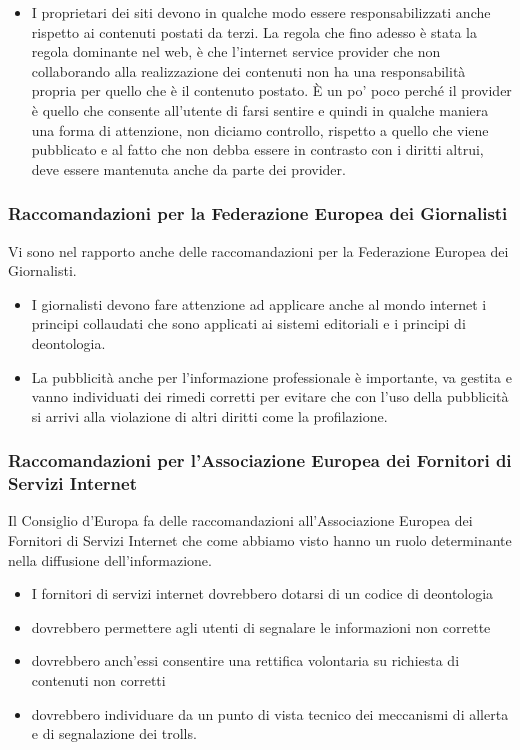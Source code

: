 \begin{itemize}
    \item I proprietari dei siti devono in qualche modo essere responsabilizzati anche rispetto ai contenuti postati da terzi. La regola che fino adesso è stata la regola dominante nel web, è che l'internet service provider che non collaborando alla realizzazione dei contenuti non ha una responsabilità propria per quello che è il contenuto postato. È un po' poco perché il provider è quello che consente all'utente di farsi sentire e quindi in qualche maniera una forma di attenzione, non diciamo controllo, rispetto a quello che viene pubblicato e al fatto che non debba essere in contrasto con i diritti altrui, deve essere mantenuta anche da parte dei provider. 
\end{itemize}

\subsubsection{Raccomandazioni per la Federazione Europea dei Giornalisti}
Vi sono nel rapporto anche delle raccomandazioni per la Federazione Europea dei Giornalisti. 

\begin{itemize}
    \item I giornalisti devono fare attenzione ad applicare anche al mondo internet i principi collaudati che sono applicati ai sistemi editoriali e i principi di deontologia.
    \item La pubblicità anche per l'informazione professionale è importante, va gestita e vanno individuati dei rimedi corretti per evitare che con l'uso della pubblicità si arrivi alla violazione di altri diritti come la profilazione. 
\end{itemize}

\subsubsection{Raccomandazioni per l'Associazione Europea dei Fornitori di Servizi Internet}

Il Consiglio d'Europa fa delle raccomandazioni all'Associazione Europea dei Fornitori di Servizi Internet che come abbiamo visto hanno un ruolo determinante nella diffusione dell'informazione. 

\begin{itemize}
    \item I fornitori di servizi internet dovrebbero dotarsi di un codice di deontologia 
    \item dovrebbero permettere agli utenti di segnalare le informazioni non corrette 
    \item dovrebbero anch'essi consentire una rettifica volontaria su richiesta di contenuti non corretti
    \item dovrebbero individuare da un punto di vista tecnico dei meccanismi di allerta e di segnalazione dei trolls.
\end{itemize}


